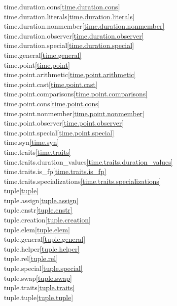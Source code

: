 \begin{multicols}{2}
time.duration.cons\quad\ref{time.duration.cons}\\
time.duration.literals\quad\ref{time.duration.literals}\\
time.duration.nonmember\quad\ref{time.duration.nonmember}\\
time.duration.observer\quad\ref{time.duration.observer}\\
time.duration.special\quad\ref{time.duration.special}\\
time.general\quad\ref{time.general}\\
time.point\quad\ref{time.point}\\
time.point.arithmetic\quad\ref{time.point.arithmetic}\\
time.point.cast\quad\ref{time.point.cast}\\
time.point.comparisons\quad\ref{time.point.comparisons}\\
time.point.cons\quad\ref{time.point.cons}\\
time.point.nonmember\quad\ref{time.point.nonmember}\\
time.point.observer\quad\ref{time.point.observer}\\
time.point.special\quad\ref{time.point.special}\\
time.syn\quad\ref{time.syn}\\
time.traits\quad\ref{time.traits}\\
time.traits.duration_values\quad\ref{time.traits.duration_values}\\
time.traits.is_fp\quad\ref{time.traits.is_fp}\\
time.traits.specializations\quad\ref{time.traits.specializations}\\
tuple\quad\ref{tuple}\\
tuple.assign\quad\ref{tuple.assign}\\
tuple.cnstr\quad\ref{tuple.cnstr}\\
tuple.creation\quad\ref{tuple.creation}\\
tuple.elem\quad\ref{tuple.elem}\\
tuple.general\quad\ref{tuple.general}\\
tuple.helper\quad\ref{tuple.helper}\\
tuple.rel\quad\ref{tuple.rel}\\
tuple.special\quad\ref{tuple.special}\\
tuple.swap\quad\ref{tuple.swap}\\
tuple.traits\quad\ref{tuple.traits}\\
tuple.tuple\quad\ref{tuple.tuple}\\

\end{multicols}
